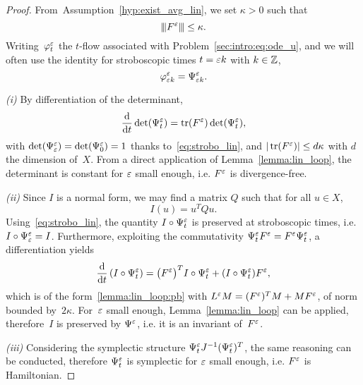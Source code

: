 \begin{proof}
  From~Assumption~\ref{hyp:exist_avg_lin}, we set $\kappa > 0$ such that
  \begin{equation*}
    {\left\vert\kern-0.25ex\left\vert\kern-0.25ex\left\vert F^\varepsilon\right\vert\kern-0.25ex\right\vert\kern-0.25ex\right\vert} \leq \kappa .
  \end{equation*}
  Writing~$\varphi^\varepsilon_t$ the $t$-flow associated with
  Problem~\eqref{sec:intro:eq:ode_u}, and we will often use the
  identity for stroboscopic times $t = \varepsilon k$ with $k \in \mathbb{Z}$, 
  \begin{equation} \label{eq:strobo_lin}
    \varphi^\varepsilon _{\varepsilon k} = \Psi^\varepsilon _{\varepsilon k} .
  \end{equation}

  \medskip\noindent%
  \textit{(i)}\indent%
  By differentiation of the determinant,
  \begin{equation*}
    \frac{\mathrm{d}}{\mathrm{d} t}\det(\Psi^\varepsilon _t) = \operatorname{tr}(F^\varepsilon) \det(\Psi^\varepsilon _t) ,
  \end{equation*}
  with $\det(\Psi^\varepsilon _\varepsilon) = \det(\Psi^\varepsilon _0) = 1$ thanks
  to~\eqref{eq:strobo_lin}, and $|\operatorname{tr}(F^\varepsilon)| \leq d\kappa$ with $d$
  the dimension of~$X$. From a direct application of
  Lemma~\ref{lemma:lin_loop}, the determinant is constant for $\varepsilon$
  small enough, i.e. $F^\varepsilon$ is divergence-free.


  \medskip\noindent%
  \textit{(ii)}\indent%
  Since $I$ is a normal form, we may find a matrix $Q$ such that for all
  $u \in X$, 
  \begin{equation}
    I(u) = u^T Q u .
  \end{equation}
  Using~\eqref{eq:strobo_lin}, the quantity $I \circ \Psi^\varepsilon _t$ is
  preserved at stroboscopic times, i.e. $I \circ \Psi^\varepsilon _\varepsilon = I$.
  Furthermore, exploiting the commutativity $\Psi^\varepsilon _t F^\varepsilon =
  F^\varepsilon \Psi^\varepsilon _t$, a differentiation yields 
  \begin{equation}
    \frac{\mathrm{d}}{\mathrm{d} t} \left( I \circ \Psi^\varepsilon _t \right)
    = \big( F^\varepsilon \big)^T I\circ \Psi^\varepsilon _t
    + (I\circ \Psi^\varepsilon _t) F^\varepsilon ,
  \end{equation}
  which is of the form~\eqref{lemma:lin_loop:pb} with $L^\varepsilon M =
  (F^\varepsilon )^T M + M F^\varepsilon$, of norm bounded by~$2\kappa$. For~$\varepsilon$
  small enough, Lemma~\ref{lemma:lin_loop} can be applied, therefore~$I$
  is preserved by $\Psi^\varepsilon$, i.e. it is an invariant of~$F^\varepsilon$.

  \medskip\noindent%
  \textit{(iii)}\indent%
  Considering the symplectic structure $\Psi^\varepsilon _t J^{-1} (\Psi^\varepsilon
  _t)^T$, the same reasoning can be conducted, therefore $\Psi^\varepsilon _t$
  is symplectic for $\varepsilon$ small enough, i.e. $F^\varepsilon$ is Hamiltonian.


\end{proof}
